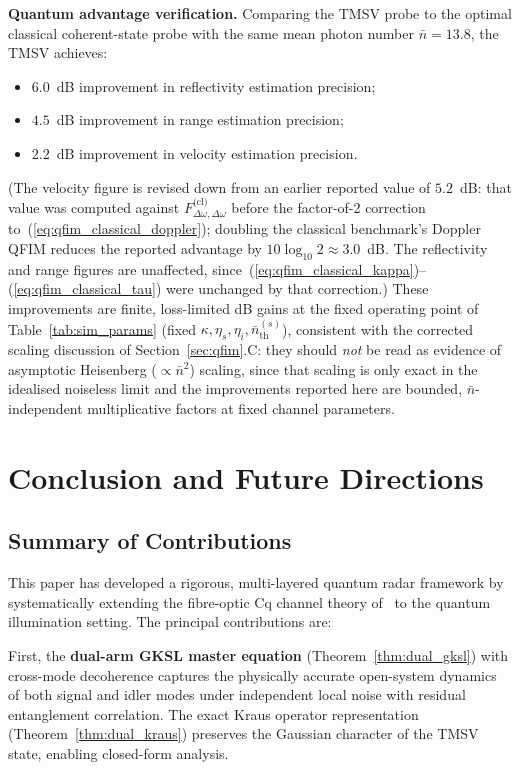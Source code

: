 \documentclass[journal]{IEEEtran}
\begin{document}
\textbf{Quantum advantage verification.} Comparing the TMSV probe to the optimal classical coherent-state probe with the same mean photon number $\bar{n} = 13.8$, the TMSV achieves:
\begin{itemize}
    \item $6.0$~dB improvement in reflectivity estimation precision;
    \item $4.5$~dB improvement in range estimation precision;
    \item $2.2$~dB improvement in velocity estimation precision.
\end{itemize}
(The velocity figure is revised down from an earlier reported value of $5.2$~dB: that value was computed against $F^{\text{(cl)}}_{\Delta\omega,\Delta\omega}$ before the factor-of-2 correction to~(\ref{eq:qfim_classical_doppler}); doubling the classical benchmark's Doppler QFIM reduces the reported advantage by $10\log_{10}2\approx3.0$~dB. The reflectivity and range figures are unaffected, since~(\ref{eq:qfim_classical_kappa})--(\ref{eq:qfim_classical_tau}) were unchanged by that correction.)
These improvements are finite, loss-limited dB gains at the fixed operating point of Table~\ref{tab:sim_params} (fixed $\kappa,\eta_s,\eta_i,\bar n_{\text{th}}^{(s)}$), consistent with the corrected scaling discussion of Section~\ref{sec:qfim}.C: they should \emph{not} be read as evidence of asymptotic Heisenberg ($\propto\bar n^2$) scaling, since that scaling is only exact in the idealised noiseless limit and the improvements reported here are bounded, $\bar n$-independent multiplicative factors at fixed channel parameters.


\section{Conclusion and Future Directions}\label{sec:conclusion}

\subsection{Summary of Contributions}

This paper has developed a rigorous, multi-layered quantum radar framework by systematically extending the fibre-optic Cq channel theory of~\cite{gautum2024rigorous} to the quantum illumination setting. The principal contributions are:

First, the \textbf{dual-arm GKSL master equation} (Theorem~\ref{thm:dual_gksl}) with cross-mode decoherence captures the physically accurate open-system dynamics of both signal and idler modes under independent local noise with residual entanglement correlation. The exact Kraus operator representation (Theorem~\ref{thm:dual_kraus}) preserves the Gaussian character of the TMSV state, enabling closed-form analysis.
\end{document}
